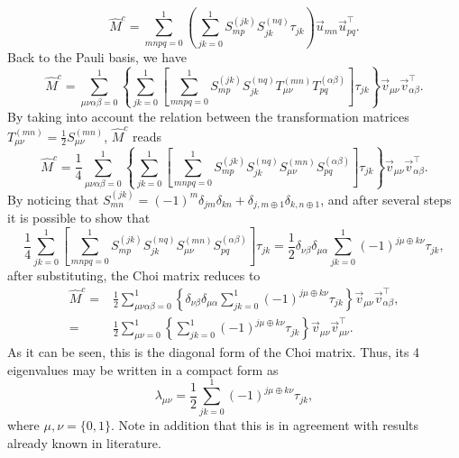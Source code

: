 \begin{equation}
\hat{M}^c=\sum_{mnpq=0}^1\left(\sum_{jk=0}^1 S_{mp}^{(jk)}S_{jk}^{(nq)}  \tau_{jk} \right) \vec{u}_{mn}\vec{u}^\intercal_{pq}.
\end{equation}
%
Back to the Pauli basis, we have
%
\begin{equation}
 \hat{M}^c=\sum_{\mu\nu\alpha\beta=0}^1\left\{\sum_{jk=0}^1\left[\sum_{mnpq=0}^1S_{mp}^{(jk)}S_{jk}^{(nq)}T_{\mu\nu}^{(mn)}T_{pq}^{(\alpha\beta)}\right]\tau_{jk}\right\}\vec{v}_{\mu\nu}\vec{v}_{\alpha\beta}^\intercal.
\end{equation}
%
By taking into account the relation between the transformation matrices $T_{\mu\nu}^{(mn)}=\frac{1}{2}S_{\mu\nu}^{(mn)}$, $\hat{M}^c$ reads
%
\begin{equation}
 \hat{M}^c=\frac{1}{4}\sum_{\mu\nu\alpha\beta=0}^1\left\{\sum_{jk=0}^1\left[\sum_{mnpq=0}^1S_{mp}^{(jk)}S_{jk}^{(nq)}S_{\mu\nu}^{(mn)}S_{pq}^{(\alpha\beta)}\right]\tau_{jk}\right\}\vec{v}_{\mu\nu}\vec{v}_{\alpha\beta}^\intercal.
\end{equation}
%
By noticing that $S_{mn}^{(jk)}=(-1)^m\delta_{jm}\delta_{kn}+\delta_{j,m\oplus 1}\delta_{k,n\oplus 1}$, and after several steps it is possible to show that 
% 
\begin{equation}
\frac{1}{4}\sum_{jk=0}^1\left[\sum_{mnpq=0}^1S_{mp}^{(jk)}S_{jk}^{(nq)}S_{\mu\nu}^{(mn)}S_{pq}^{(\alpha\beta)}\right]\tau_{jk}=\frac{1}{2}\delta_{\nu\beta}\delta_{\mu\alpha}\sum_{jk=0}^1(-1)^{j\mu\oplus k\nu}\tau_{jk},
\label{EQAL2}
\end{equation}
% 
after substituting, the Choi matrix reduces to
%
\begin{align}
 \hat{M}^c=&\frac{1}{2}\sum_{\mu\nu\alpha\beta=0}^1\left\{\delta_{\nu\beta}\delta_{\mu\alpha}\sum_{jk=0}^1(-1)^{j\mu\oplus k\nu}\tau_{jk}\right\}\vec{v}_{\mu\nu}\vec{v}_{\alpha\beta}^\intercal,\\
 =&\frac{1}{2}\sum_{\mu\nu=0}^1\left\{\sum_{jk=0}^1(-1)^{j\mu\oplus k\nu}\tau_{jk}\right\}\vec{v}_{\mu\nu}\vec{v}_{\mu\nu}^\intercal.
\end{align}
%
As it can be seen, this is the diagonal form of the Choi matrix. Thus, its 4 eigenvalues may be written in a compact form as
%
\begin{equation}
\lambda_{\mu\nu}=\frac{1}{2}\sum_{jk=0}^1(-1)^{j\mu\oplus k\nu}\tau_{jk},
\end{equation}
%
where $\mu,\nu=\{0,1\}$. Note in addition that this is in agreement with results already known in literature.

